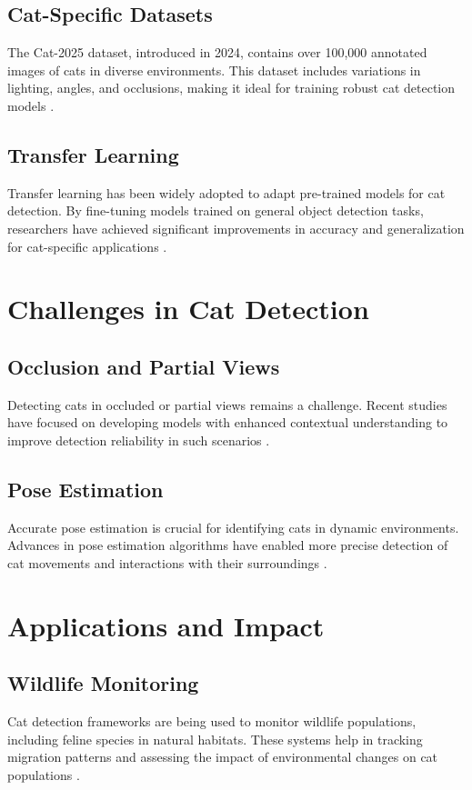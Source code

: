 \documentclass{article}
\begin{document}
\subsection{Cat-Specific Datasets}
The Cat-2025 dataset, introduced in 2024, contains over 100,000 annotated images of cats in diverse environments. This dataset includes variations in lighting, angles, and occlusions, making it ideal for training robust cat detection models \cite{cat2025}.

\subsection{Transfer Learning}
Transfer learning has been widely adopted to adapt pre-trained models for cat detection. By fine-tuning models trained on general object detection tasks, researchers have achieved significant improvements in accuracy and generalization for cat-specific applications \cite{transfer_learning}.

\section{Challenges in Cat Detection}
\subsection{Occlusion and Partial Views}
Detecting cats in occluded or partial views remains a challenge. Recent studies have focused on developing models with enhanced contextual understanding to improve detection reliability in such scenarios \cite{occlusion_challenge}.

\subsection{Pose Estimation}
Accurate pose estimation is crucial for identifying cats in dynamic environments. Advances in pose estimation algorithms have enabled more precise detection of cat movements and interactions with their surroundings \cite{pose_estimation}.

\section{Applications and Impact}
\subsection{Wildlife Monitoring}
Cat detection frameworks are being used to monitor wildlife populations, including feline species in natural habitats. These systems help in tracking migration patterns and assessing the impact of environmental changes on cat populations \cite{wildlife_monitoring}.
\end{document}

